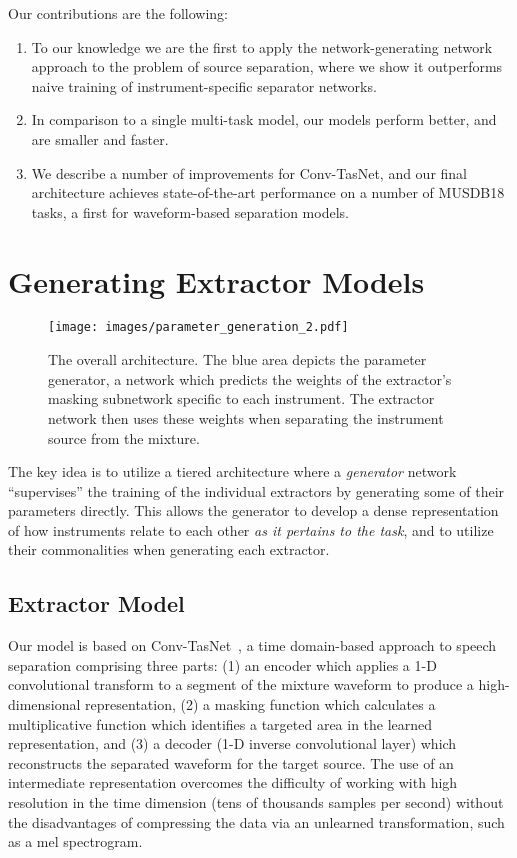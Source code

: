 \documentclass{article}
\begin{document}
Our contributions are the following:
\begin{enumerate}
    \itemsep-0.08em 
    \item To our knowledge we are the first to apply the network-generating network approach to the problem of source separation, where we show it outperforms naive training of instrument-specific separator networks.
    \item In comparison to a single multi-task model, our models perform better, and are smaller and faster.
    \item We describe a number of improvements for Conv-TasNet, and our final architecture achieves state-of-the-art performance on a number of MUSDB18 tasks, a first for waveform-based separation models.
\end{enumerate}

 \section{Generating Extractor Models}

\begin{figure}
\centering
\texttt{[image: images/parameter\_generation\_2.pdf]}
\caption{The overall architecture. The blue area depicts the parameter generator, a network which predicts the weights of the extractor's masking subnetwork specific to each instrument.  The extractor network then uses these weights when separating the instrument source from the mixture.}
\end{figure}

The key idea is to utilize a tiered architecture where a \emph{generator} network ``supervises'' the training of the individual extractors by generating some of their parameters directly.  This allows the generator to develop a dense representation of how instruments relate to each other \emph{as it pertains to the task}, and to utilize their commonalities when generating each extractor.

\subsection{Extractor Model}
\label{sec:extractor}

Our model is based on Conv-TasNet~\cite{conv-tasnet}, a time domain-based approach to speech separation comprising three parts: (1) an encoder which applies a 1-D convolutional transform to a segment of the mixture waveform to produce a high-dimensional representation, (2) a masking function which calculates a multiplicative function which identifies a targeted area in the learned representation, and (3) a decoder (1-D inverse convolutional layer) which reconstructs the separated waveform for the target source.  The use of an intermediate representation overcomes the difficulty of working with high resolution in the time dimension (tens of thousands samples per second) without the disadvantages of compressing the data via an unlearned transformation, such as a mel spectrogram.
\end{document}
